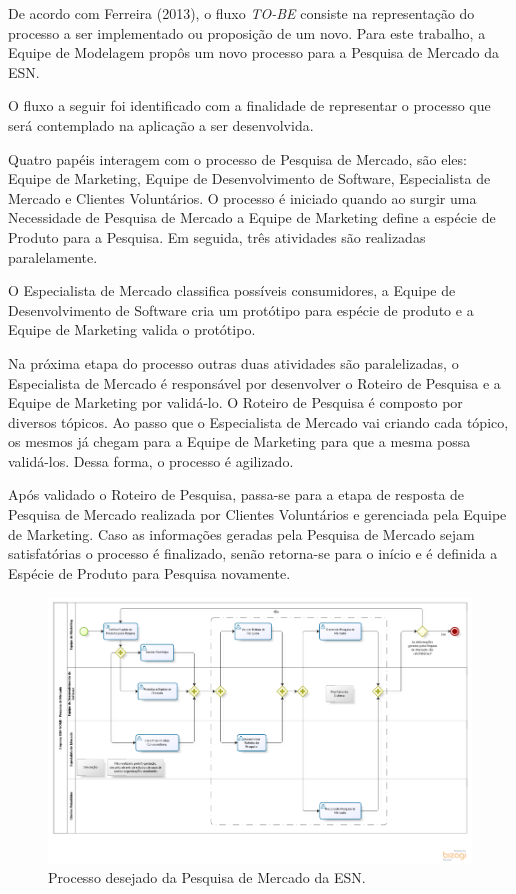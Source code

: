 	De acordo com Ferreira (2013), o fluxo \textit{TO-BE} consiste na representação do processo a ser implementado ou proposição de um novo. Para este trabalho, a Equipe de Modelagem propôs um novo processo para a Pesquisa de Mercado da ESN.

	O fluxo a seguir foi identificado com a finalidade de representar o processo que será contemplado na aplicação a ser desenvolvida.

	Quatro papéis interagem com o processo de Pesquisa de Mercado, são eles: Equipe de Marketing, Equipe de Desenvolvimento de Software, Especialista de Mercado e Clientes Voluntários. O processo é iniciado quando ao surgir uma Necessidade de Pesquisa de Mercado a Equipe de Marketing define a espécie de Produto para a Pesquisa. Em seguida, três atividades são realizadas paralelamente. 

	O Especialista de Mercado classifica possíveis consumidores, a Equipe de Desenvolvimento de Software cria um protótipo para espécie de produto e a Equipe de Marketing valida o protótipo.

	Na próxima etapa do processo outras duas atividades são paralelizadas, o Especialista de Mercado é responsável por desenvolver o Roteiro de Pesquisa e a Equipe de Marketing por validá-lo. O Roteiro de Pesquisa é composto por diversos tópicos. Ao passo que o Especialista de Mercado vai criando cada tópico, os mesmos já chegam para a Equipe de Marketing para que a mesma possa validá-los. Dessa forma, o processo é agilizado.

	Após validado o Roteiro de Pesquisa, passa-se para a etapa de resposta de Pesquisa de Mercado realizada por Clientes Voluntários e gerenciada pela Equipe de Marketing. Caso as informações geradas pela Pesquisa de Mercado sejam satisfatórias o processo é finalizado, senão retorna-se para o início e é definida a Espécie de Produto para Pesquisa novamente.

	\begin{landscape}
	\begin{figure}[!htp]
		\centering
		\includegraphics{imagens/to-be2.png}
		\caption{Processo desejado da Pesquisa de Mercado da ESN.}
		\label{imagem}
	\end{figure}
	\end{landscape}
